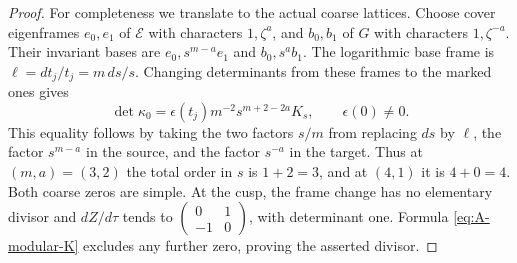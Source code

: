 \begin{proof}
For completeness we translate to the actual coarse lattices.  Choose
cover eigenframes $e_0,e_1$ of $\mathcal E$ with characters
$1,\zeta^a$, and $b_0,b_1$ of $G$ with characters
$1,\zeta^{-a}$.  Their invariant bases are
$e_0,s^{m-a}e_1$ and $b_0,s^ab_1$.  The logarithmic base frame is
$\ell=dt_j/t_j=m\,ds/s$.  Changing determinants from these frames
to the marked ones gives
\[
\det\kappa_0=\epsilon(t_j)m^{-2}s^{m+2-2a}K_s,
\qquad \epsilon(0)\ne0.
\]
This equality follows by taking the two factors $s/m$ from replacing
$ds$ by $\ell$, the factor $s^{m-a}$ in the source, and the factor
$s^{-a}$ in the target.  Thus at $(m,a)=(3,2)$ the total order in
$s$ is $1+2=3$, and at $(4,1)$ it is $4+0=4$.
Both coarse zeros are simple.  At the cusp, the frame change has
no elementary divisor and $dZ/d\tau$ tends to
$\left(\begin{smallmatrix}0&1\\-1&0\end{smallmatrix}\right)$,
with determinant one.  Formula \eqref{eq:A-modular-K} excludes any
further zero, proving the asserted divisor.
\end{proof}

